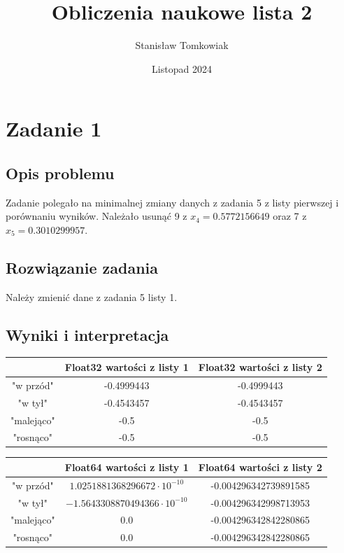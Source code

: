 \documentclass{article}
\title{Obliczenia naukowe lista 2}
\author{Stanisław Tomkowiak}
\date{Listopad 2024}
\begin{document}
\maketitle



\section*{Zadanie 1}
\subsection*{Opis problemu}
Zadanie polegało na minimalnej zmiany danych z zadania 5 z listy pierwszej i porównaniu wyników. Należało usunąć 9 z $x_4=0.5772156649$ oraz 7 z $x_5=0.3010299957$.
\subsection*{Rozwiązanie zadania}
Należy zmienić dane z zadania 5 listy 1.
\subsection*{Wyniki i interpretacja}
\begin{center}
  \begin{tabular}{|c|c|c|}
    \hline
      & Float32 wartości z listy 1   & Float32 wartości z listy 2 \\ [0.5ex]
    \hline
    "w przód"  & -0.4999443  & -0.4999443  \\
    \hline
    "w tył"    & -0.4543457 & -0.4543457 \\
    \hline
    "malejąco" & -0.5       & -0.5  \\
    \hline
    "rosnąco"  & -0.5       & -0.5  \\
    \hline
  \end{tabular}
\end{center}


\begin{center}
  \begin{tabular}{|c|c|c|}
    \hline
      & Float64 wartości z listy 1    & Float64 wartości z listy 2 \\ [0.5ex]
    \hline
    "w przód"  &$1.0251881368296672 \cdot 10^{-10}$  & -0.004296342739891585\\
    \hline
    "w tył"    & $-1.5643308870494366 \cdot 10^{-10}$& -0.004296342998713953  \\
    \hline
    "malejąco" & 0.0     & -0.004296342842280865 \\
    \hline
    "rosnąco"  & 0.0      & -0.004296342842280865 \\
    \hline
  \end{tabular}
\end{center}
\end{document}
